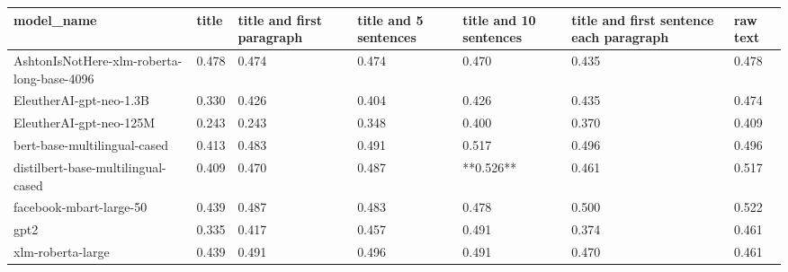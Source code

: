 \begin{tabular}{lllllll}
\toprule
                                model\_name & title & title and first paragraph & title and 5 sentences & title and 10 sentences & title and first sentence each paragraph & raw text \\
\midrule
AshtonIsNotHere-xlm-roberta-long-base-4096 & 0.478 &                     0.474 &                 0.474 &                  0.470 &                                   0.435 &    0.478 \\
                   EleutherAI-gpt-neo-1.3B & 0.330 &                     0.426 &                 0.404 &                  0.426 &                                   0.435 &    0.474 \\
                   EleutherAI-gpt-neo-125M & 0.243 &                     0.243 &                 0.348 &                  0.400 &                                   0.370 &    0.409 \\
              bert-base-multilingual-cased & 0.413 &                     0.483 &                 0.491 &                  0.517 &                                   0.496 &    0.496 \\
        distilbert-base-multilingual-cased & 0.409 &                     0.470 &                 0.487 &              **0.526** &                                   0.461 &    0.517 \\
                   facebook-mbart-large-50 & 0.439 &                     0.487 &                 0.483 &                  0.478 &                                   0.500 &    0.522 \\
                                      gpt2 & 0.335 &                     0.417 &                 0.457 &                  0.491 &                                   0.374 &    0.461 \\
                         xlm-roberta-large & 0.439 &                     0.491 &                 0.496 &                  0.491 &                                   0.470 &    0.461 \\
\bottomrule
\end{tabular}

